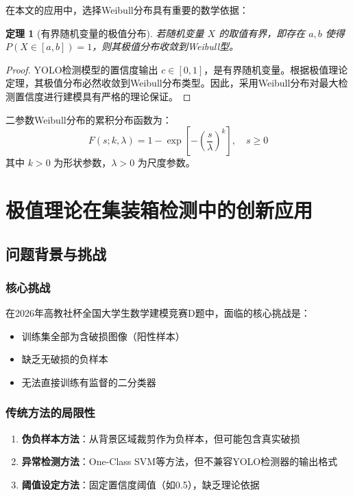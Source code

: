 \documentclass[12pt,a4paper]{ctexart}
\theoremstyle{cumcm}
\newtheorem{theorem}{定理}[section]
\begin{document}
在本文的应用中，选择Weibull分布具有重要的数学依据：

\begin{theorem}[有界随机变量的极值分布]
若随机变量 $X$ 的取值有界，即存在 $a, b$ 使得 $P(X \in [a, b]) = 1$，则其极值分布收敛到Weibull型。
\end{theorem}

\begin{proof}
YOLO检测模型的置信度输出 $c \in [0, 1]$，是有界随机变量。根据极值理论定理，其极值分布必然收敛到Weibull分布类型。因此，采用Weibull分布对最大检测置信度进行建模具有严格的理论保证。
\end{proof}

二参数Weibull分布的累积分布函数为：
\begin{equation}
F(s; k, \lambda) = 1 - \exp\!\left[-\left(\frac{s}{\lambda}\right)^{k}\right], \quad s \ge 0
\end{equation}
其中 $k > 0$ 为形状参数，$\lambda > 0$ 为尺度参数。

\section{极值理论在集装箱检测中的创新应用}

\subsection{问题背景与挑战}

\subsubsection{核心挑战}

在2026年高教社杯全国大学生数学建模竞赛D题中，面临的核心挑战是：
\begin{itemize}
\item 训练集全部为含破损图像（阳性样本）
\item 缺乏无破损的负样本
\item 无法直接训练有监督的二分类器
\end{itemize}

\subsubsection{传统方法的局限性}

\begin{enumerate}[leftmargin=2.2em,itemsep=2pt]
\item \textbf{伪负样本方法}：从背景区域裁剪作为负样本，但可能包含真实破损
\item \textbf{异常检测方法}：One-Class SVM等方法，但不兼容YOLO检测器的输出格式
\item \textbf{阈值设定方法}：固定置信度阈值（如0.5），缺乏理论依据
\end{enumerate}
\end{document}
